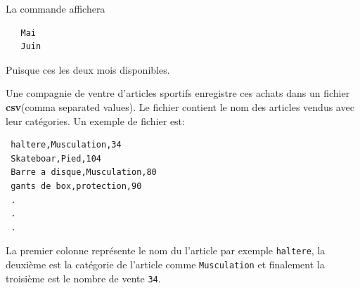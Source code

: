 \documentclass[palatino,code]{ensaexam}
\begin{document}
\begin{questions}
\begin{parts}
  La commande affichera 
  \begin{verbatim}
   Mai 
   Juin
  \end{verbatim}
 Puisque ces les deux mois disponibles. 
\end{parts}
\newpage
Une compagnie de ventre d'articles sportifs enregistre ces achats dans un fichier
\textbf{csv}(comma separated values). Le fichier contient le nom des
articles vendus avec leur catégories.  Un exemple de fichier est:

\begin{verbatim}
 haltere,Musculation,34
 Skateboar,Pied,104
 Barre a disque,Musculation,80
 gants de box,protection,90
 .
 .
 .
\end{verbatim}


La premier colonne représente le nom du l'article par exemple \texttt{haltere},
la deuxième est la catégorie de l'article comme \texttt{Musculation} et
finalement la troisième est le nombre de vente \texttt{34}.



\end{questions}
 
 
\end{document}
